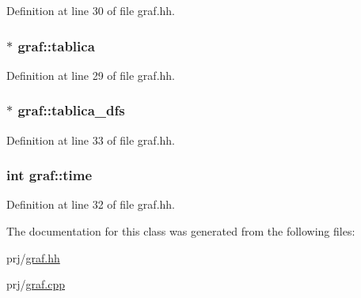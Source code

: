 \-Definition at line 30 of file graf.\-hh.

\hypertarget{classgraf_a028d547c797438718da6241a28b32db5}{
\subsubsection[{tablica}]{$\ast$ {\bf graf\-::tablica}}}\label{classgraf_a028d547c797438718da6241a28b32db5}


\-Definition at line 29 of file graf.\-hh.

\hypertarget{classgraf_a325616745236599f83bffb58d61b0fa9}{
\subsubsection[{tablica\-\_\-dfs}]{$\ast$ {\bf graf\-::tablica\-\_\-dfs}}}\label{classgraf_a325616745236599f83bffb58d61b0fa9}


\-Definition at line 33 of file graf.\-hh.

\hypertarget{classgraf_a9202cb6ab351f5bbdbb79de440ab1fb5}{
\subsubsection[{time}]{\setlength{\rightskip}{0pt plus 5cm}int {\bf graf\-::time}}}\label{classgraf_a9202cb6ab351f5bbdbb79de440ab1fb5}


\-Definition at line 32 of file graf.\-hh.



\-The documentation for this class was generated from the following files\-:\begin{DoxyCompactItemize}
\item 
prj/\hyperlink{graf_8hh}{graf.\-hh}\item 
prj/\hyperlink{graf_8cpp}{graf.\-cpp}\end{DoxyCompactItemize}
